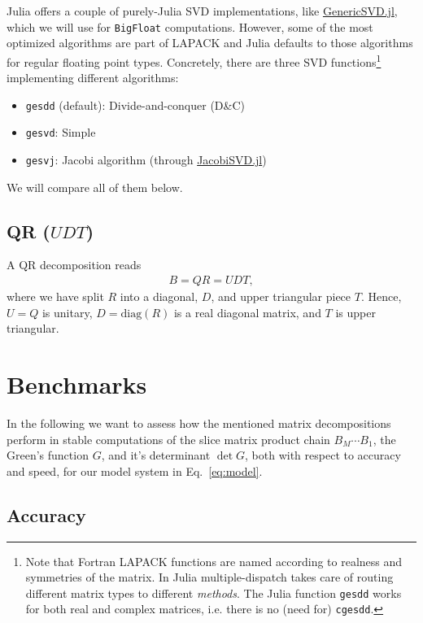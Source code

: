\documentclass[%
 reprint,
superscriptaddress,
showpacs,
 amsmath,amssymb,
 aps,
 prb,
longbibliography,
]{revtex4-1}
\begin{document}
Julia offers a couple of purely-Julia SVD implementations, like \href{https://github.com/JuliaLinearAlgebra/GenericSVD.jl/}{GenericSVD.jl}, which we will use for \texttt{BigFloat} computations. However, some of the most optimized algorithms are part of LAPACK\cite{LAPACK} and Julia defaults to those algorithms for regular floating point types. Concretely, there are three SVD functions\footnote{Note that Fortran LAPACK functions are named according to realness and symmetries of the matrix. In Julia multiple-dispatch takes care of routing different matrix types to different \textit{methods}. The Julia function \texttt{gesdd} works for both real and complex matrices, i.e. there is no (need for) \texttt{cgesdd}.} implementing different algorithms:
\begin{itemize}
	\item \texttt{gesdd} (default): Divide-and-conquer (D\&C)
	\item \texttt{gesvd}: Simple
	\item \texttt{gesvj}: Jacobi algorithm (through \href{https://github.com/RalphAS/JacobiSVD.jl}{JacobiSVD.jl})
\end{itemize}
We will compare all of them below.

\subsection{QR ($UDT$)}
A QR decomposition reads
\begin{align}
B = QR = UDT,
\end{align}
where we have split $R$ into a diagonal, $D$, and upper triangular piece $T$. Hence, $U = Q$ is unitary, $D = \textrm{diag}(R)$ is a real diagonal matrix, and $T$ is upper triangular.

\section{Benchmarks}

In the following we want to assess how the mentioned matrix decompositions perform in stable computations of the slice matrix product chain $B_M \cdots B_1$, the Green's function $G$, and it's determinant $\det G$, both with respect to accuracy and speed, for our model system in Eq.~\ref{eq:model}.

\subsection{Accuracy}
\end{document}
